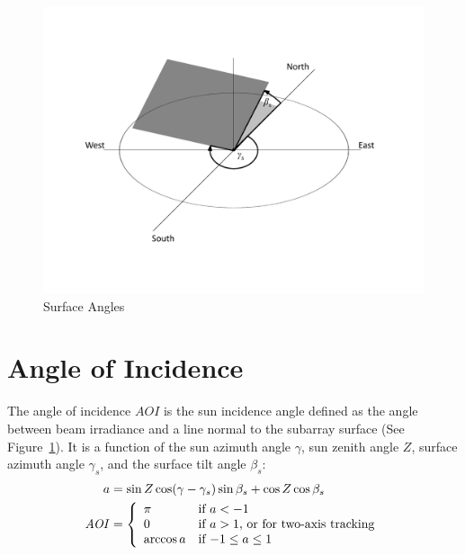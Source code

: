 \documentclass[12pt,letterpaper]{article}
\newcommand\AOI{\ensuremath{\mathit{AOI}}}
\begin{document}
\begin{figure}
\begin{center}
\includegraphics[scale=0.6]{surface-angles}
\caption{Surface Angles}
\label{fig-arrayorientation}
\end{center}
\end{figure}

\section{Angle of Incidence} \label{sec-theta}

The angle of incidence $\AOI$ is the sun incidence angle defined as the angle between beam irradiance and a line normal to the subarray surface (See Figure~\ref{fig-arrayorientation}). It is a function of the sun azimuth angle $\gamma$, sun zenith angle $Z$, surface azimuth angle $\gamma_s$, and the surface tilt angle $\beta_s$:
\begin{align}\label{eqn-inc}
a &= \sin Z \cos(\gamma - \gamma_s) \sin\beta_s + \cos Z \cos\beta_s \notag\\
\AOI &= \left\{
\begin{array}{ll}
\pi & \text{if $a<-1$}\\
0 & \text{if $a>1$, or for two-axis tracking}\\
\arccos a & \text{if $-1 \leq a \leq 1$}
\end{array}
\right.
\end{align}

\end{document}
